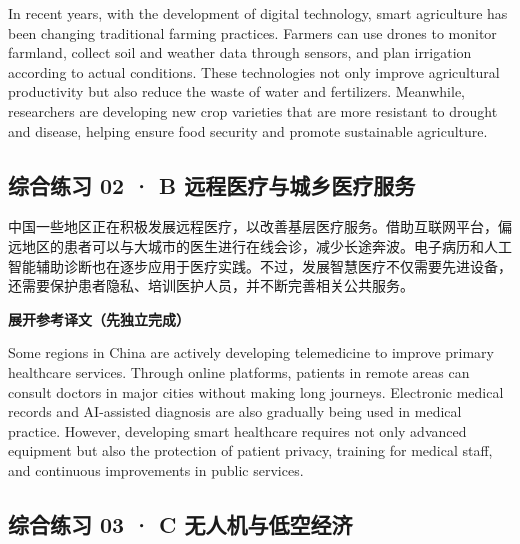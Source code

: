 \documentclass[a4paper,11pt,UTF8,fontset=none]{ctexart}
\begin{document}
\noindent In recent years, with the development of digital technology, smart agriculture has been changing traditional farming practices. Farmers can use drones to monitor farmland, collect soil and weather data through sensors, and plan irrigation according to actual conditions. These technologies not only improve agricultural productivity but also reduce the waste of water and fertilizers. Meanwhile, researchers are developing new crop varieties that are more resistant to drought and disease, helping ensure food security and promote sustainable agriculture.\par

\vspace{4pt}

\subsection{综合练习 02 · B 远程医疗与城乡医疗服务}

\par

\noindent 中国一些地区正在积极发展远程医疗，以改善基层医疗服务。借助互联网平台，偏远地区的患者可以与大城市的医生进行在线会诊，减少长途奔波。电子病历和人工智能辅助诊断也在逐步应用于医疗实践。不过，发展智慧医疗不仅需要先进设备，还需要保护患者隐私、培训医护人员，并不断完善相关公共服务。\par

\noindent\colorbox{HeadBlue}{\strut {\bfseries 展开参考译文（先独立完成）}}\par\vspace{1pt}

\noindent Some regions in China are actively developing telemedicine to improve primary healthcare services. Through online platforms, patients in remote areas can consult doctors in major cities without making long journeys. Electronic medical records and AI-assisted diagnosis are also gradually being used in medical practice. However, developing smart healthcare requires not only advanced equipment but also the protection of patient privacy, training for medical staff, and continuous improvements in public services.\par

\vspace{4pt}

\subsection{综合练习 03 · C 无人机与低空经济}
\end{document}
